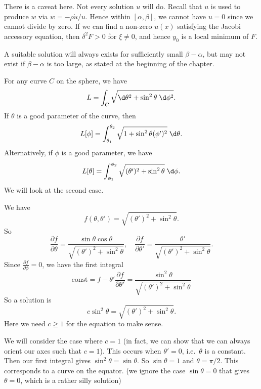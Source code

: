 \documentclass[a4paper]{article}
\begin{document}
There is a caveat here. Not every solution $u$ will do. Recall that $u$ is used to produce $w$ via $w = -\rho\dot{u}/u$. Hence within $[\alpha, \beta]$, we cannot have $u = 0$ since we cannot divide by zero. If we can find a non-zero $u(x)$ satisfying the Jacobi accessory equation, then $\delta^2 F > 0$ for $\xi \not= 0$, and hence $y_0$ is a local minimum of $F$.

A suitable solution will always exists for sufficiently small $\beta - \alpha$, but may not exist if $\beta - \alpha$ is too large, as stated at the beginning of the chapter.

\begin{eg}
  For any curve $C$ on the sphere, we have
  \[
    L = \int_C \sqrt{\d \theta^2 + \sin^2 \theta \;\d \phi^2}.
  \]
  If $\theta$ is a good parameter of the curve, then
  \[
    L[\phi] = \int_{\theta _1}^{\theta_2} \sqrt{1 + \sin^2 \theta (\phi')^2}\;\d \theta.
  \]
  Alternatively, if $\phi$ is a good parameter, we have
  \[
    L[\theta] = \int_{\phi_1}^{\phi_2}\sqrt{(\theta')^2 + \sin^2 \theta}\;\d \phi.
  \]
  We will look at the second case.

  We have
  \[
    f(\theta, \theta') = \sqrt{(\theta')^2 + \sin^2 \theta}.
  \]
  So
  \[
    \frac{\partial f}{\partial \theta} = \frac{\sin \theta\cos \theta}{\sqrt{(\theta')^2 + \sin^2 \theta}},\quad \frac{\partial f}{\partial \theta'} = \frac{\theta'}{\sqrt{(\theta')^2 + \sin^2 \theta}}.
  \]
  Since $\frac{\partial f}{\partial \phi} = 0$, we have the first integral
  \[
    \text{const} = f - \theta' \frac{\partial f}{\partial \theta'} = \frac{\sin^2 \theta}{\sqrt{(\theta')^2 + \sin^2 \theta}}
  \]
  So a solution is
  \[
    c\sin^2 \theta = \sqrt{(\theta')^2 + \sin^2 \theta}.
  \]
  Here we need $c \geq 1$ for the equation to make sense.

  We will consider the case where $c = 1$ (in fact, we can show that we can always orient our axes such that $c = 1$). This occurs when $\theta' = 0$, i.e.\ $\theta$ is a constant. Then our first integral gives $\sin^2 \theta = \sin \theta$. So $\sin \theta = 1$ and $\theta = \pi/2$. This corresponds to a curve on the equator. (we ignore the case $\sin \theta = 0$ that gives $\theta = 0$, which is a rather silly solution)


\end{eg}
\end{document}
